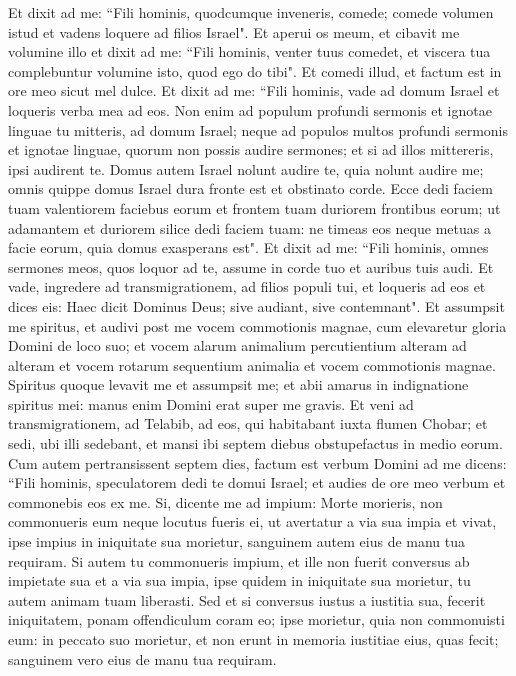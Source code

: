 \begin{biblechapter}  
\verse Et dixit ad me: “Fili hominis, quodcumque inveneris, comede; comede volumen istud et vadens loquere ad filios Israel". 
\verse Et aperui os meum, et cibavit me volumine illo 
\verse et dixit ad me: “Fili hominis, venter tuus comedet, et viscera tua complebuntur volumine isto, quod ego do tibi". Et comedi illud, et factum est in ore meo sicut mel dulce. 
\verse Et dixit ad me: “Fili hominis, vade ad domum Israel et loqueris verba mea ad eos. 
\verse Non enim ad populum profundi sermonis et ignotae linguae tu mitteris, ad domum Israel;  
\verse neque ad populos multos profundi sermonis et ignotae linguae, quorum non possis audire sermones; et si ad illos mittereris, ipsi audirent te. 
\verse Domus autem Israel nolunt audire te, quia nolunt audire me; omnis quippe domus Israel dura fronte est et obstinato corde. 
\verse Ecce dedi faciem tuam valentiorem faciebus eorum et frontem tuam duriorem frontibus eorum; 
\verse ut adamantem et duriorem silice dedi faciem tuam: ne timeas eos neque metuas a facie eorum, quia domus exasperans est". 
\verse Et dixit ad me: “Fili hominis, omnes sermones meos, quos loquor ad te, assume in corde tuo et auribus tuis audi. 
\verse Et vade, ingredere ad transmigrationem, ad filios populi tui, et loqueris ad eos et dices eis: Haec dicit Dominus Deus; sive audiant, sive contemnant". 
\verse Et assumpsit me spiritus, et audivi post me vocem commotionis magnae, cum elevaretur gloria Domini de loco suo; 
\verse et vocem alarum animalium percutientium alteram ad alteram et vocem rotarum sequentium animalia et vocem commotionis magnae. 
\verse Spiritus quoque levavit me et assumpsit me; et abii amarus in indignatione spiritus mei: manus enim Domini erat super me gravis.  
\verse Et veni ad transmigrationem, ad Telabib, ad eos, qui habitabant iuxta flumen Chobar; et sedi, ubi illi sedebant, et mansi ibi septem diebus obstupefactus in medio eorum. 
\verse Cum autem pertransissent septem dies, factum est verbum Domini ad me dicens: 
\verse “Fili hominis, speculatorem dedi te domui Israel; et audies de ore meo verbum et commonebis eos ex me. 
\verse Si, dicente me ad impium: Morte morieris, non commonueris eum neque locutus fueris ei, ut avertatur a via sua impia et vivat, ipse impius in iniquitate sua morietur, sanguinem autem eius de manu tua requiram. 
\verse Si autem tu commonueris impium, et ille non fuerit conversus ab impietate sua et a via sua impia, ipse quidem in iniquitate sua morietur, tu autem animam tuam liberasti. 
\verse Sed et si conversus iustus a iustitia sua, fecerit iniquitatem, ponam offendiculum coram eo; ipse morietur, quia non commonuisti eum: in peccato suo morietur, et non erunt in memoria iustitiae eius, quas fecit; sanguinem vero eius de manu tua requiram. 

\end{biblechapter}
